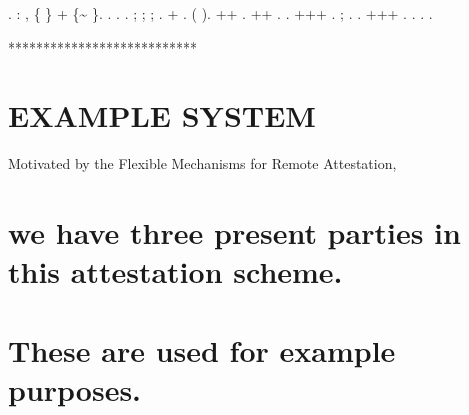 \documentclass[12pt]{report}
\begin{document}
\begin{coqdoccode}
\coqdocindent{2.00em}
.\coqdoceol
\coqdocemptyline
\coqdocnoindent
{}  : \coqdockw{\ensuremath{\forall}}   , \{   \} + \{\~{}   \}.\coqdoceol
\coqdocnoindent
{}.\coqdoceol
\coqdocnoindent
{}.   .  ; ;  ;   .\coqdoceol
\coqdocnoindent
+ .  (  ).\coqdoceol
\coqdocnoindent
++ .\coqdoceol
\coqdocnoindent
++      .  .\coqdoceol
\coqdocnoindent
+++ .  ; . .\coqdoceol
\coqdocnoindent
+++ . . .\coqdoceol
\coqdocnoindent
{}.\coqdoceol
\coqdocemptyline
\end{coqdoccode}
***************************
\section{EXAMPLE SYSTEM}


 

 Motivated by the Flexible Mechanisms for Remote Attestation, 
\section{we have three present parties in this attestation scheme.}


\section{These are used for example purposes.}
\end{document}
